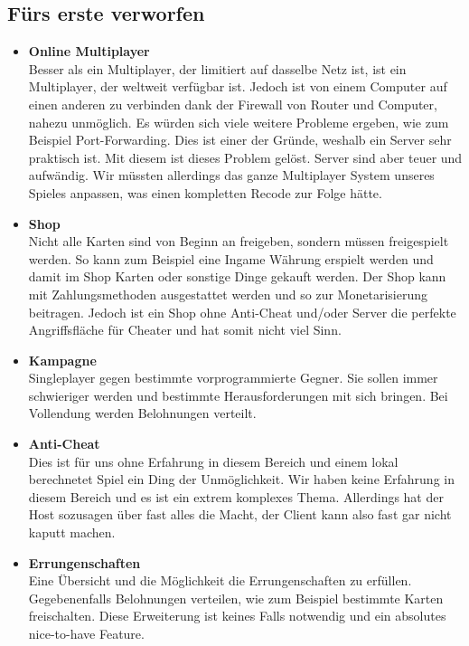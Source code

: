 \subsection*{Fürs erste verworfen}
\begin{itemize}
    \item \textbf{Online Multiplayer} \\
        Besser als ein Multiplayer, der limitiert auf dasselbe Netz ist, ist ein Multiplayer, der weltweit verfügbar ist. Jedoch ist von einem Computer auf einen anderen zu
        verbinden dank der Firewall von Router und Computer, nahezu unmöglich. Es würden sich viele weitere Probleme ergeben, wie zum Beispiel Port-Forwarding. Dies ist einer der Gründe, weshalb ein Server sehr praktisch ist. Mit diesem ist dieses
        Problem gelöst. Server sind aber teuer und aufwändig. Wir müssten allerdings das ganze Multiplayer System unseres Spieles anpassen, was einen kompletten Recode zur Folge hätte.
    \item \textbf{Shop} \\
        Nicht alle Karten sind von Beginn an freigeben, sondern müssen freigespielt werden.
        So kann zum Beispiel eine Ingame Währung erspielt werden und damit im Shop Karten oder sonstige Dinge gekauft werden.
        Der Shop kann mit Zahlungsmethoden ausgestattet werden und so zur Monetarisierung beitragen.
        Jedoch ist ein Shop ohne Anti-Cheat und/oder Server die perfekte Angriffsfläche für Cheater und hat somit nicht viel Sinn.
    \item \textbf{Kampagne} \\
        Singleplayer gegen bestimmte vorprogrammierte Gegner. Sie sollen immer schwieriger werden und bestimmte Herausforderungen mit sich bringen.
        Bei Vollendung werden Belohnungen verteilt.
    \item \textbf{Anti-Cheat} \\
        Dies ist für uns ohne Erfahrung in diesem Bereich und einem lokal berechnetet Spiel ein Ding der Unmöglichkeit.
        Wir haben keine Erfahrung in diesem Bereich und es ist ein extrem komplexes Thema. Allerdings hat der Host sozusagen über fast alles die Macht, der Client kann also fast
        gar nicht kaputt machen. 
    \item \textbf{Errungenschaften} \\
        Eine Übersicht und die Möglichkeit die Errungenschaften zu erfüllen.
        Gegebenenfalls Belohnungen verteilen, wie zum Beispiel bestimmte Karten freischalten.
        Diese Erweiterung ist keines Falls notwendig und ein absolutes nice-to-have Feature.
\end{itemize}
